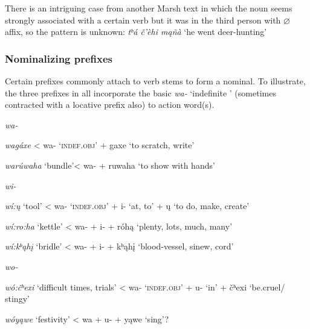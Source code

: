 \documentclass[output=paper]{LSP/langsci}
\begin{document}
There is an intriguing case from another Marsh text in which the noun seems strongly associated with a certain verb but it was in the third person with $\varnothing$ affix, so the  pattern is unknown: \textit{tʰá \v{c}'\`ehi m\k{a}ñà} `he went deer-hunting' \citep[``The Wanderer'' LN47]{Marsh1936}

\subsubsection{Nominalizing prefixes} 
Certain prefixes commonly attach to verb stems to form a nominal.  To illustrate, the three prefixes in  all incorporate the basic \textit{wa-} `indefinite ' (sometimes contracted with a locative prefix also) to action word(s).

\begin{exe}
\ex \label{wawiwo}
\begin{xlist}
\ex \itshape wa-     	       											
	       	
\textit{wagáxe}         < wa- {\upshape `\textsc{indef.obj}'} + gaxe {\upshape `to scratch, write'}
		
\textit{warúwaha}  {\upshape `bundle'}< wa-  + ruwaha {\upshape `to show with hands'}
            
\ex \itshape  wi-															

\textit{wí:\k{u}}    {\upshape `tool'}    < wa- {\upshape `\textsc{indef.obj}'} + i- {\upshape `at, to'} + \k{u} {\upshape `to do, make, create'}
            
\textit{wí:ro:ha}  {\upshape `kettle'} < wa- + i-  + róh\k{a} {\upshape `plenty, lots, much, many'}

\textit{wí:kʰ\k{a}h\k{i}} {\upshape `bridle'}  < wa- + i-  + kʰ\k{a}h\k{i} {\upshape `blood-vessel, sinew, cord'} \citep[{\upshape ``The Outsider''} LN65]{Marsh1936}\footnotemark

\ex \itshape wo-  															

\textit{wó:\v{c}ʰexi}   {\upshape `difficult times, trials'} < wa- {\upshape `\textsc{indef.obj}'} + u- {\upshape `in'} + \v{c}ʰexi {\upshape `be.cruel/ stingy'}
	
\textit{wóy\k{a}we}  {\upshape `festivity'} < wa + u- + y\k{a}we {\upshape `sing'}? \footnotemark
\end{xlist}
\end{exe}
 
\end{document}
